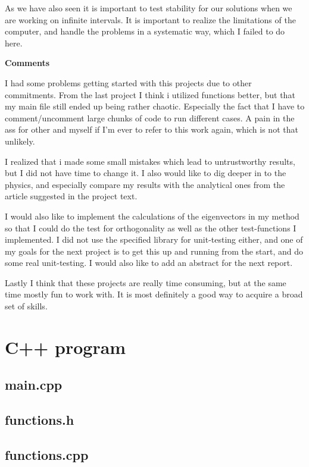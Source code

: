 \documentclass[11pt, a4paper]{article}
\begin{document}
As we have also seen it is important to test stability for our solutions when we are working on infinite intervals. It is important to realize the limitations of the computer, and handle the problems in a systematic way, which I failed to do here.

\textbf{Comments}

I had some problems getting started with this projects due to other commitments. From the last project I think i utilized functions better, but that my main file still ended up being rather chaotic. Especially the fact that I have to comment/uncomment large chunks of code to run different cases. A pain in the ass for other and myself if I'm ever to refer to this work again, which is not that unlikely. 

I realized that i made some small mistakes which lead to untrustworthy results, but I did not have time to change it. I also would like to dig deeper in to the physics, and especially compare my results with the analytical ones from the article suggested in the project text. 

I would also like to implement the calculations of the eigenvectors in my method so that I could do the test for orthogonality as well as the other test-functions I implemented. I did not use the specified library for unit-testing either, and one of my goals for the next project is to get this up and running from the start, and do some real unit-testing. I would also like to add an abstract for the next report. 

Lastly I think that these projects are really time consuming, but at the same time mostly fun to work with. It is most definitely a good way to acquire a broad set of skills.
\clearpage
\appendix
\section{C++ program}
\subsection{main.cpp}

\subsection{functions.h}

\subsection{functions.cpp}

\end{document}

